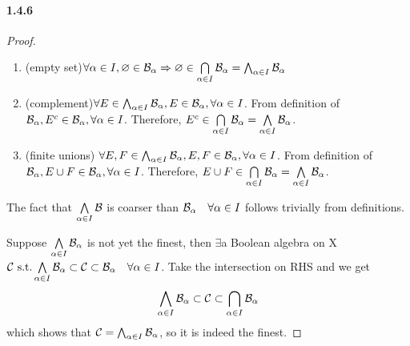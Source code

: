 \documentclass{article}
\begin{document}
\paragraph{1.4.6}
\begin{proof}
\begin{enumerate}
\item{(empty set)}$\forall \alpha\in I, \varnothing\in \mathcal{B}_\alpha\Rightarrow \varnothing\in \bigcap\limits_{\alpha\in I}\mathcal{B}_\alpha=\bigwedge_{\alpha\in I}\mathcal{B}_\alpha$
\item{(complement)}$\forall E\in\bigwedge_{\alpha\in I}\mathcal{B}_\alpha, E\in \mathcal{B}_\alpha,\forall \alpha\in I$. From definition of $\mathcal{B}_\alpha, E^c\in \mathcal{B}_\alpha,\forall \alpha\in I$. Therefore, $E^c\in \bigcap\limits_{\alpha\in I}\mathcal{B}_\alpha=\bigwedge\limits_{\alpha\in I}\mathcal{B}_{\alpha}$.
\item{(finite unions)} $\forall E,F\in\bigwedge_{\alpha\in I}\mathcal{B}_\alpha, E,F\in \mathcal{B}_\alpha,\forall \alpha\in I$. From definition of $\mathcal{B}_\alpha, E\cup F\in \mathcal{B}_\alpha,\forall \alpha\in I$. Therefore, $E\cup F\in \bigcap\limits_{\alpha\in I}\mathcal{B}_\alpha=\bigwedge\limits_{\alpha\in I}\mathcal{B}_{\alpha}$.
\end{enumerate}

The fact that $\bigwedge\limits_{\alpha\in I}\mathcal{B}$ is coarser than $\mathcal{B}_{\alpha}\quad \forall \alpha\in I$ follows trivially from definitions.

Suppose $\bigwedge\limits_{\alpha\in I}\mathcal{B}_\alpha$ is not yet the finest, then $\exists $a Boolean algebra on X$\mathcal{C}\text{ s.t.} \bigwedge\limits_{\alpha\in I}\mathcal{B}_\alpha\subset\mathcal{C}\subset \mathcal{B}_{\alpha}\quad \forall \alpha \in I$. Take the intersection on RHS and we get 
\[\bigwedge\limits_{\alpha\in I}\mathcal{B}_\alpha\subset\mathcal{C}\subset \bigcap_{\alpha\in I}\mathcal{B}_{\alpha}\] 
which shows that $\mathcal{C}=\bigwedge_{\alpha\in I}\mathcal{B}_\alpha$, so it is indeed the finest.
\end{proof}
\end{document}
